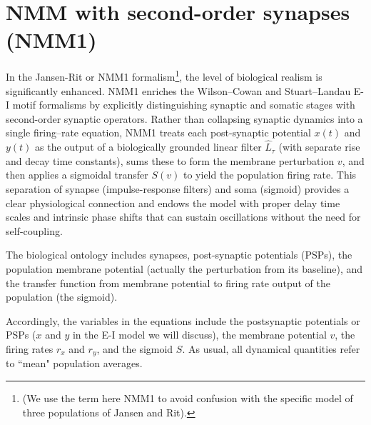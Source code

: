 \documentclass[12pt]{article}
\numberwithin{equation}{section}
\begin{document}

\section{NMM with second-order synapses (NMM1)} \label{sec:NMM1}
\begin{tcolorbox}[colback=gray!6,colframe=gray!6,enlarge left by=0mm, boxrule=0pt, enhanced, sharp corners]
In the Jansen-Rit or NMM1 formalism\footnote{(We use the term here NMM1 to avoid confusion with the specific model of three populations of Jansen and Rit).}, the level of biological realism is significantly enhanced. 
NMM1 enriches the Wilson–Cowan and Stuart–Landau E-I motif formalisms by explicitly distinguishing synaptic and somatic stages with second-order synaptic operators.  Rather than collapsing synaptic dynamics into a single firing–rate equation, NMM1 treats each post-synaptic potential $x(t)$ and $y(t)$ as the output of a biologically grounded linear filter $\hat L_{\tau}$ (with separate rise and decay time constants), sums these to form the membrane perturbation $v$, and then applies a sigmoidal transfer $S(v)$ to yield the population firing rate.  This separation of synapse (impulse-response filters) and soma (sigmoid)  provides a clear physiological connection and endows the model with proper delay time scales and intrinsic phase shifts that can sustain oscillations without the need for self-coupling.

 The biological ontology includes synapses, post-synaptic potentials (PSPs), the population membrane potential (actually the perturbation from its baseline), and the transfer function from membrane potential to firing rate output of the population (the sigmoid).



Accordingly, the variables in the equations include the postsynaptic potentials or PSPs ($x$ and $y$ in the E-I model we will discuss), the membrane potential $v$, the firing rates $r_x$ and $r_y$, and the sigmoid $S$.  As usual, all dynamical quantities refer to  ``mean" population averages. 
\end{tcolorbox}
\end{document}
